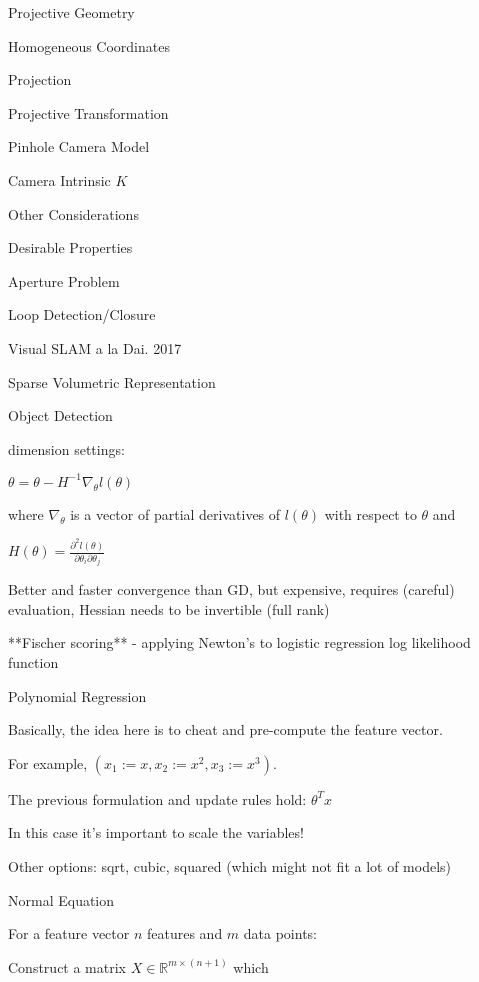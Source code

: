 \begin{section}
\begin{subsubsection}
\begin{subsubsection}
\begin{subsubsection}
\begin{section}{Projective Geometry}
\begin{subsection}{Homogeneous Coordinates}
\begin{subsubsection}
{\begin{subsubsection}{Projection}
\begin{subsubsection}{Projective Transformation}
\begin{subsection}
\begin{subsubsection}
\begin{subsubsection}
\begin{subsubsection}
{\begin{subsubsection}
\begin{subsection}
\begin{subsection} {Pinhole Camera Model}
\begin{subsection} {Camera Intrinsic $K$}
\begin{subsection}
\begin{subsection}
\begin{subsubsection}{Other Considerations}
{\begin{subsection}
\begin{subsubsection}{Desirable Properties}
\begin{section}
\begin{subsection}
\begin{subsection}
\begin{subsection}
\begin{section}
\begin{subsection}
\begin{subsubsection}
\begin{subsubsection}
\begin{subsection}
\begin{section}
\begin{subsection}
\begin{subsubsection}{Aperture Problem}
\begin{subsubsection}
{\begin{section}
\begin{subsubsection}
\begin{subsubsection}
\begin{subsubsection}
\begin{subsection}
\begin{subsection}
\begin{subsection}
\begin{subsection}
\begin{subsection}
\begin{subsection}
\begin{subsection}
\begin{subsubsection}
{\begin{subsubsection}
{\begin{subsubsection}
\begin{section}
\begin{section}
\begin{section}
\begin{subsubsection}
\begin{subsubsection}{Loop Detection/Closure}
\begin{subsubsection}{Visual SLAM a la Dai. 2017}
\begin{subsubsection}{Sparse Volumetric Representation}
\begin{subsection}
\begin{section}{Object Detection}
\begin{subsubsection}
{\begin{subsection}
\begin{subsection}
\begin{section}
\begin{section}
\begin{subsection}
\begin{subsubsection}
\begin{subsubsection}
\begin{subsection}
\begin{subsection}
\begin{subsubsection}
\begin{subsubsection}
\begin{subsubsection}
{dimension settings:

$\theta = \theta - H^{-1}\nabla_\theta l(\theta)$

where $\nabla_\theta$ is a vector of partial derivatives of $l(\theta)$ with respect to $\theta$ and 

$H(\theta)=\frac{\partial^2 l(\theta)}{\partial \theta_i\partial\theta_j}$

Better and faster convergence than GD, but expensive, requires (careful) evaluation, Hessian needs to be invertible (full rank)

**Fischer scoring** - applying Newton's to logistic regression log likelihood function

\begin{subsection}  Polynomial Regression

Basically, the idea here is to cheat and pre-compute the feature vector. 

For example, $(x_1 := x, x_2 := x^2, x_3 := x^3)$. 

The previous formulation and update rules hold: $\theta^Tx$

In this case it's important to scale the variables!

Other options: sqrt, cubic, squared (which might not fit a lot of models)

\begin{subsection} Normal Equation

For a feature vector $n$ features and $m$ data points: 

Construct a matrix $X  \in \mathbb{R}^{m\times (n+1)}$ which 
\end{subsection}
\end{subsection}}
\end{subsubsection}
\end{subsubsection}
\end{subsubsection}
\end{subsection}
\end{subsection}
\end{subsubsection}
\end{subsubsection}
\end{subsection}
\end{section}
\end{section}
\end{subsection}
\end{subsection}}
\end{subsubsection}
\end{section}
\end{subsection}
\end{subsubsection}
\end{subsubsection}
\end{subsubsection}
\end{subsubsection}
\end{section}
\end{section}
\end{section}
\end{subsubsection}}
\end{subsubsection}}
\end{subsubsection}
\end{subsection}
\end{subsection}
\end{subsection}
\end{subsection}
\end{subsection}
\end{subsection}
\end{subsection}
\end{subsubsection}
\end{subsubsection}
\end{subsubsection}
\end{section}}
\end{subsubsection}
\end{subsubsection}
\end{subsection}
\end{section}
\end{subsection}
\end{subsubsection}
\end{subsubsection}
\end{subsection}
\end{section}
\end{subsection}
\end{subsection}
\end{subsection}
\end{section}
\end{subsubsection}
\end{subsection}}
\end{subsubsection}
\end{subsection}
\end{subsection}
\end{subsection}
\end{subsection}
\end{subsection}
\end{subsubsection}}
\end{subsubsection}
\end{subsubsection}
\end{subsubsection}
\end{subsection}
\end{subsubsection}
\end{subsubsection}}
\end{subsubsection}
\end{subsection}
\end{section}
\end{subsubsection}
\end{subsubsection}
\end{subsubsection}
\end{section}
